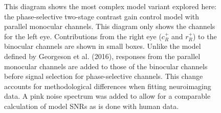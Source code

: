 \documentclass[
  12pt,
]{article}
\begin{document}
\begin{figure}


\caption{\label{fig-modelDiagram}This diagram shows the most complex
model variant explored here: the phase-selective two-stage contrast gain
control model with parallel monocular channels. This diagram only shows
the channels for the left eye. Contributions from the right eye
(\(c^+_R\) and \(r^+_R\)) to the binocular channels are shown in small
boxes. Unlike the model defined by Georgeson et al. (2016), responses
from the parallel monocular channels are added to those of the binocular
channels before signal selection for phase-selective channels. This
change accounts for methodological differences when fitting neuroimaging
data. A pink noise spectrum was added to allow for a comparable
calculation of model SNRs as is done with human data.}

\end{figure}%
\end{document}
